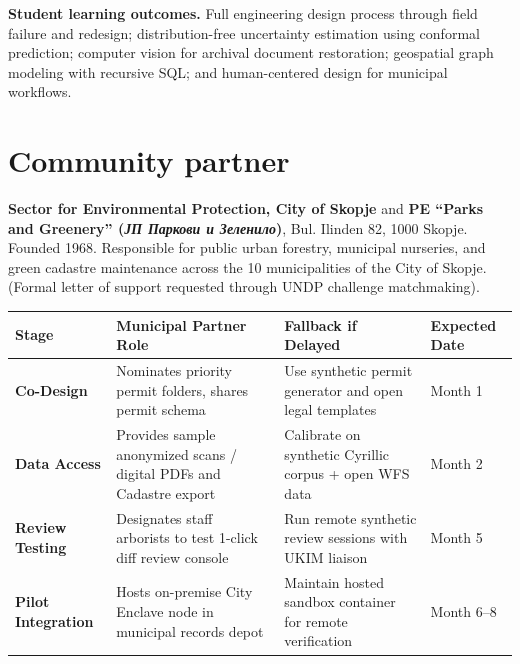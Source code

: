 \documentclass[9pt,a4paper]{article}
\begin{document}
\vspace{0.1em}
\textbf{Student learning outcomes.} Full engineering design process through field failure and redesign; distribution-free uncertainty estimation using conformal prediction; computer vision for archival document restoration; geospatial graph modeling with recursive SQL; and human-centered design for municipal workflows.

\vspace{0.15em}
\section{Community partner}
\textbf{Sector for Environmental Protection, City of Skopje} and \textbf{PE ``Parks and Greenery'' (\textit{ЈП Паркови и Зеленило})}, Bul. Ilinden 82, 1000 Skopje. Founded 1968. Responsible for public urban forestry, municipal nurseries, and green cadastre maintenance across the 10 municipalities of the City of Skopje. (Formal letter of support requested through UNDP challenge matchmaking).

\clearpage

\renewcommand{\arraystretch}{0.91}
\begin{tabularx}{\textwidth}{@{}lXlX@{}}
\toprule
\textsf{\textbf{\fontsize{8pt}{10pt}\selectfont Stage}} & \textsf{\textbf{\fontsize{8pt}{10pt}\selectfont Municipal Partner Role}} & \textsf{\textbf{\fontsize{8pt}{10pt}\selectfont Fallback if Delayed}} & \textsf{\textbf{\fontsize{8pt}{10pt}\selectfont Expected Date}} \\
\midrule
\textbf{Co-Design} & Nominates priority permit folders, shares permit schema & Use synthetic permit generator and open legal templates & Month 1 \\
\textbf{Data Access} & Provides sample anonymized scans / digital PDFs and Cadastre export & Calibrate on synthetic Cyrillic corpus + open WFS data & Month 2 \\
\textbf{Review Testing} & Designates staff arborists to test 1-click diff review console & Run remote synthetic review sessions with UKIM liaison & Month 5 \\
\textbf{Pilot Integration} & Hosts on-premise City Enclave node in municipal records depot & Maintain hosted sandbox container for remote verification & Month 6--8 \\
\bottomrule
\end{tabularx}
\end{document}
